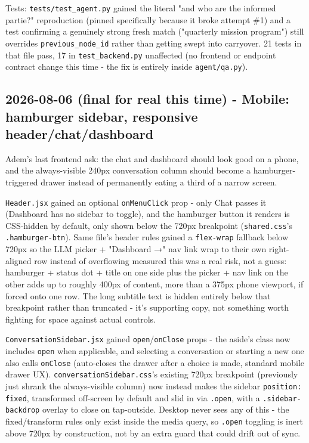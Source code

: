 Tests: \texttt{tests/\allowbreak{}test\_\allowbreak{}agent.py} gained the literal "and who are the informed partie?" reproduction (pinned specifically because it broke attempt \#1) and a test confirming a genuinely strong fresh match ("quarterly mission program") still overrides \texttt{previous\_\allowbreak{}node\_\allowbreak{}id} rather than getting swept into carryover. 21 tests in that file pass, 17 in \texttt{test\_\allowbreak{}backend.py} unaffected (no frontend or endpoint contract change this time - the fix is entirely inside \texttt{agent/\allowbreak{}qa.py}).

\subsection*{2026-08-06 (final for real this time) - Mobile: hamburger sidebar, responsive header/chat/dashboard}
Adem's last frontend ask: the chat and dashboard should look good on a phone, and the always-visible 240px conversation column should become a hamburger-triggered drawer instead of permanently eating a third of a narrow screen.

\texttt{Header.jsx} gained an optional \texttt{onMenuClick} prop - only Chat passes it (Dashboard has no sidebar to toggle), and the hamburger button it renders is CSS-hidden by default, only shown below the 720px breakpoint (\texttt{shared.css}'s \texttt{.hamburger-btn}). Same file's header rules gained a \texttt{flex-wrap} fallback below 720px so the LLM picker + "Dashboard →" nav link wrap to their own right-aligned row instead of overflowing measured this was a real risk, not a guess: hamburger + status dot + title on one side plus the picker + nav link on the other adds up to roughly 400px of content, more than a 375px phone viewport, if forced onto one row. The long subtitle text is hidden entirely below that breakpoint rather than truncated - it's supporting copy, not something worth fighting for space against actual controls.

\texttt{ConversationSidebar.jsx} gained \texttt{open}/\texttt{onClose} props - the aside's class now includes \texttt{open} when applicable, and selecting a conversation or starting a new one also calls \texttt{onClose} (auto-closes the drawer after a choice is made, standard mobile drawer UX). \texttt{conversationSidebar.css}'s existing 720px breakpoint (previously just shrank the always-visible column) now instead makes the sidebar \texttt{position: fixed}, transformed off-screen by default and slid in via \texttt{.open}, with a \texttt{.sidebar-backdrop} overlay to close on tap-outside. Desktop never sees any of this - the fixed/transform rules only exist inside the media query, so \texttt{.open} toggling is inert above 720px by construction, not by an extra guard that could drift out of sync.


